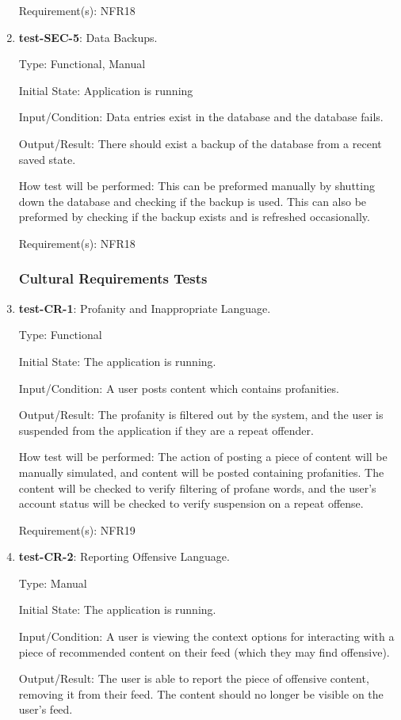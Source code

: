\documentclass[12pt, titlepage]{article}
\begin{document}
\begin{enumerate}
		Requirement(s): NFR18
		
		\item{\textbf{test-SEC-5}}: Data Backups.
		
		Type: Functional, Manual
		
		Initial State: Application is running
		
		Input/Condition: Data entries exist in the database and the database fails.
		
		Output/Result: There should exist a backup of the database from a recent saved state.
		
		How test will be performed: This can be preformed manually by shutting down the database and checking if the backup is used. This can also be preformed by checking if the backup exists and is refreshed occasionally.
		
		Requirement(s): NFR18
	\subsubsection{Cultural Requirements Tests}
		\item{\textbf{test-CR-1}}: Profanity and Inappropriate Language.
		
		Type: Functional
		
		Initial State: The application is running.
		
		Input/Condition: A user posts content which contains profanities.
		
		Output/Result: The profanity is filtered out by the system, and the user is suspended from the application if they are a repeat offender.
		
		How test will be performed: The action of posting a piece of content will be manually simulated, and content will be posted containing profanities. The content will be checked to verify filtering of profane words, and the user's account status will be checked to verify suspension on a repeat offense.
		
		Requirement(s): NFR19
		
		\item{\textbf{test-CR-2}}: Reporting Offensive Language.
		
		Type: Manual
		
		Initial State: The application is running.
		
		Input/Condition: A user is viewing the context options for interacting with a piece of recommended content on their feed (which they may find offensive).
		
		Output/Result: The user is able to report the piece of offensive content, removing it from their feed. The content should no longer be visible on the user's feed.
		

\end{enumerate}
\end{document}

